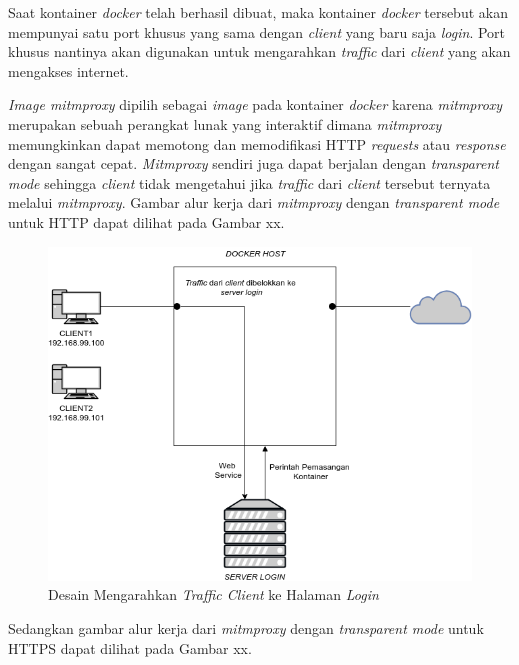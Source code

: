 	Saat kontainer \textit{docker} telah berhasil dibuat, maka kontainer \textit{docker} tersebut akan mempunyai satu port khusus yang sama dengan \textit{client} yang baru saja \textit{login}. Port khusus nantinya akan digunakan untuk mengarahkan \textit{traffic} dari \textit{client} yang akan mengakses internet.
	
	\textit{Image mitmproxy} dipilih sebagai \textit{image} pada kontainer \textit{docker} karena \textit{mitmproxy} merupakan sebuah perangkat lunak yang interaktif dimana \textit{mitmproxy} memungkinkan dapat memotong dan memodifikasi HTTP \textit{requests} atau \textit{response} dengan sangat cepat. \textit{Mitmproxy} sendiri juga dapat berjalan dengan \textit{transparent mode} sehingga \textit{client} tidak mengetahui jika \textit{traffic} dari \textit{client} tersebut ternyata melalui \textit{mitmproxy}. Gambar alur kerja dari \textit{mitmproxy} dengan \textit{transparent mode} untuk HTTP dapat dilihat pada Gambar xx.
	
	\begin{figure}[H]
		\centering
		\includegraphics[width=\linewidth]{images/bab3/DIAGRAM2}
		\caption{Desain Mengarahkan \textit{Traffic Client} ke Halaman \textit{Login}}
		\label{dessainmengarahkankehalamanlogin}
	\end{figure}
	
	Sedangkan gambar alur kerja dari \textit{mitmproxy} dengan \textit{transparent mode} untuk HTTPS dapat dilihat pada Gambar xx.
	
